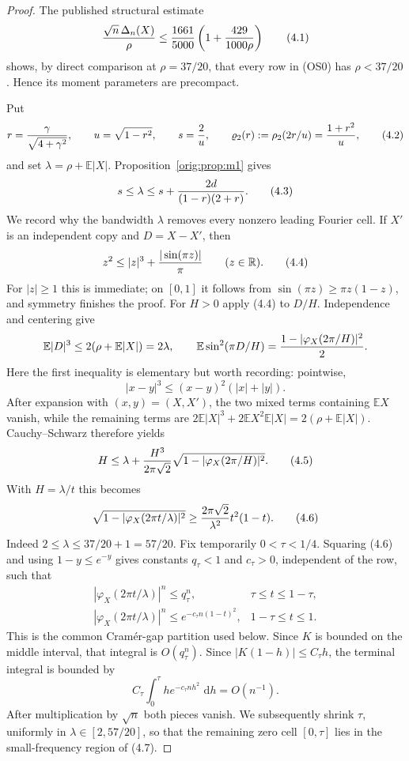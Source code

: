 \documentclass[11pt,a4paper]{article}
\numberwithin{equation}{section}
\theoremstyle{definition}
\theoremstyle{remark}
\newcommand{\E}{\mathbb E}
\newcommand{\R}{\mathbb R}
\newcommand{\dd}{\,\mathrm d}
\begin{document}
\begin{proof}
The published structural estimate \cite{Shevtsova2013}
\[
 {\sqrt n\,\Delta_n(X)\over\rho}
 \le {1661\over5000}\left(1+{429\over1000\rho}\right)       \tag{4.1}
\]
shows, by direct comparison at $\rho=37/20$, that every row in (OS0)
has $\rho<37/20$.  Hence its moment parameters are precompact.

Put
\[
 r={\gamma\over\sqrt{4+\gamma^2}},\qquad u=\sqrt{1-r^2},
 \qquad s={2\over u},\qquad
 \varrho_2(r):=\rho_2(2r/u)={1+r^2\over u},             \tag{4.2}
\]
and set $\lambda=\rho+\E|X|$.  Proposition~\ref{orig:prop:m1} gives
\[
 s\le\lambda\le s+{2d\over(1-r)(2+r)}.                 \tag{4.3}
\]
We record why the bandwidth $\lambda$ removes every nonzero leading
Fourier cell.  If $X'$ is an independent copy and $D=X-X'$, then
\[
 z^2\le |z|^3+{ |\sin(\pi z)|\over\pi}\qquad(z\in\R). \tag{4.4}
\]
For $|z|\ge1$ this is immediate; on $[0,1]$ it follows from
$\sin(\pi z)\ge\pi z(1-z)$, and symmetry finishes the proof.  For $H>0$
apply (4.4) to $D/H$.  Independence and centering give
\[
 \E|D|^3\le2(\rho+\E|X|)=2\lambda,\qquad
 \E\sin^2(\pi D/H)={1-|\varphi_X(2\pi/H)|^2\over2}.
\]
Here the first inequality is elementary but worth recording: pointwise,
\[
 |x-y|^3\le(x-y)^2(|x|+|y|).
\]
After expansion with $(x,y)=(X,X')$, the two mixed terms containing
$\E X$ vanish, while the remaining terms are
$2\E|X|^3+2\E X^2\E|X|=2(\rho+\E|X|)$.
Cauchy--Schwarz therefore yields
\[
 H\le\lambda+{H^3\over2\pi\sqrt2}
              \sqrt{1-|\varphi_X(2\pi/H)|^2}.          \tag{4.5}
\]
With $H=\lambda/t$ this becomes
\[
 \sqrt{1-|\varphi_X(2\pi t/\lambda)|^2}
 \ge {2\pi\sqrt2\over\lambda^2}t^2(1-t).             \tag{4.6}
\]
Indeed $2\le\lambda\le37/20+1=57/20$.  Fix temporarily
$0<\tau<1/4$.  Squaring (4.6) and using $1-y\le e^{-y}$ gives constants
$q_\tau<1$ and $c_\tau>0$, independent of the row, such that
\[
 \begin{array}{ll}
 |\varphi_X(2\pi t/\lambda)|^n\le q_\tau^n,
      &\tau\le t\le1-\tau,\\[1mm]
 |\varphi_X(2\pi t/\lambda)|^n
      \le e^{-c_\tau n(1-t)^2},&1-\tau\le t\le1.
 \end{array}                                                   \tag{4.6a}
\]
This is the common Cram\'er-gap partition used below.  Since $K$ is bounded
on the middle interval, that integral is $O(q_\tau^n)$.  Since
$|K(1-h)|\le C_\tau h$, the terminal integral is bounded by
\[
 C_\tau\int_0^\tau h e^{-c_\tau nh^2}\,\dd h=O(n^{-1}).           \tag{4.6b}
\]
After multiplication by $\sqrt n$ both pieces vanish.  We subsequently
shrink $\tau$, uniformly in $\lambda\in[2,57/20]$, so that the remaining
zero cell $[0,\tau]$ lies in the small-frequency region of (4.7).


\end{proof}
\end{document}
